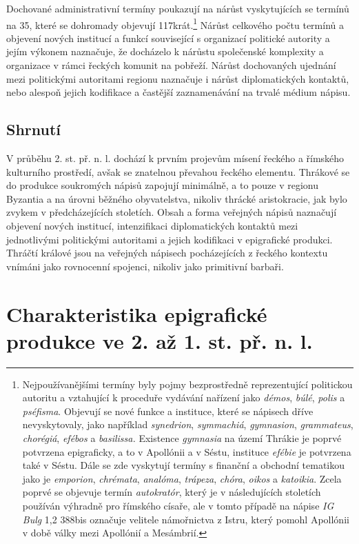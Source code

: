Dochované administrativní termíny poukazují na nárůst vyskytujících se termínů na 35, které se dohromady objevují 117krát.\footnote{Nejpoužívanějšími termíny byly pojmy bezprostředně reprezentující politickou autoritu a vztahující k proceduře vydávání nařízení jako {\em démos}, {\em búlé}, {\em polis} a {\em pséfisma}. Objevují se nové funkce a instituce, které se nápisech dříve nevyskytovaly, jako například {\em synedrion}, {\em symmachiá}, {\em gymnasion}, {\em grammateus}, {\em chorégiá}, {\em efébos} a {\em basilissa.} Existence {\em gymnasia} na území Thrákie je poprvé potvrzena epigraficky, a to v Apollónii a v Séstu, instituce {\em efébie} je potvrzena také v Séstu. Dále se zde vyskytují termíny s finanční a obchodní tematikou jako je {\em emporion}, {\em chrémata}, {\em analóma}, {\em trápeza}, {\em chóra}, {\em oikos} a {\em katoikia}. Zcela poprvé se objevuje termín {\em autokratór}, který je v následujících stoletích používán výhradně pro římského císaře, ale v tomto případě na nápise {\em IG Bulg} 1,2 388bis označuje velitele námořnictva z Istru, který pomohl Apollónii v době války mezi Apollónií a Mesámbrií.} Nárůst celkového počtu termínů a objevení nových institucí a funkcí související s organizací politické autority a jejím výkonem naznačuje, že docházelo k nárůstu společenské komplexity a organizace v rámci řeckých komunit na pobřeží. Nárůst dochovaných ujednání mezi politickými autoritami regionu naznačuje i nárůst diplomatických kontaktů, nebo alespoň jejich kodifikace a častější zaznamenávání na trvalé médium nápisu.

\subsection[shrnutí-11]{Shrnutí}

V průběhu 2. st. př. n. l. dochází k prvním projevům mísení řeckého a římského kulturního prostředí, avšak se znatelnou převahou řeckého elementu. Thrákové se do produkce soukromých nápisů zapojují minimálně, a to pouze v regionu Byzantia a na úrovni běžného obyvatelstva, nikoliv thrácké aristokracie, jak bylo zvykem v předcházejících stoletích. Obsah a forma veřejných nápisů naznačují objevení nových institucí, intenzifikaci diplomatických kontaktů mezi jednotlivými politickými autoritami a jejich kodifikaci v epigrafické produkci. Thráčtí králové jsou na veřejných nápisech pocházejících z řeckého kontextu vnímáni jako rovnocenní spojenci, nikoliv jako primitivní barbaři.

\section[charakteristika-epigrafické-produkce-ve-2.-až-1.-st.-př.-n.-l.]{Charakteristika epigrafické produkce ve 2. až 1. st. př. n. l.}

